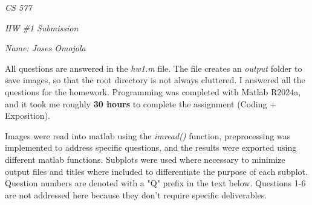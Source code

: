 \documentclass[12pt]{report}
\begin{document}
\centerline{\it CS 577}
\centerline{\it HW \#1 Submission}
\centerline{\it Name: Joses Omojola}

All questions are answered in the \emph{hw1.m} file. The file creates an \emph{output} folder to save images, so that 
the root directory is not always cluttered. I answered all the questions for the homework. Programming was completed 
with Matlab R2024a, and it took me roughly \textbf{30 hours} to complete the assignment (Coding + Exposition).

Images were read into matlab using the \emph{imread()} function, preprocessing was implemented to address specific
questions, and the results were exported using different matlab functions. Subplots were used where necessary to 
minimize output files and titles where included to differentiate the purpose of each subplot. Question numbers are
denoted with a "Q" prefix in the text below. Questions 1-6 are not addressed here because they don't require specific
deliverables.
\end{document}
